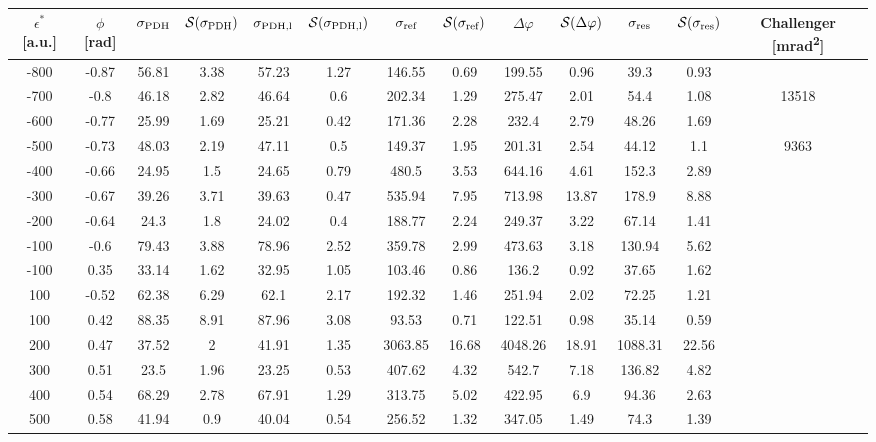 \begin{landscape}
	
	\begin{table}
	\centering
	\begin{tabular}{|c|c|c|c|c|c|c|c|c|c|c|c|c|}
		\hline
		$\epsilon^*$ [a.u.] & $\phi$ [\si{\radian}] & $\sigma_{\text{PDH}}$ & $\mathcal{S}(\sigma_{\text{PDH}})$ & $\sigma_{\text{PDH,l}}$ & $\mathcal{S}(\sigma_{\text{PDH,l}})$  & $\sigma_{\text{ref}}$ & $\mathcal{S}(\sigma_{\text{ref}})$ & $\Delta \varphi$ & $\mathcal{S}(\Delta \varphi)$ & $\sigma_{\text{res}}$  & $\mathcal{S}(\sigma_{\text{res}})$ & Challenger [\si{\milli\radian\squared}] \\
		\hline
		\hline
		-800 & -0.87 & 56.81 & 3.38 & 57.23 & 1.27 & 146.55 & 0.69 & 199.55 & 0.96 & 39.3 & 0.93 & \\
		-700 & -0.8 & 46.18 & 2.82 & 46.64 & 0.6 & 202.34 & 1.29 & 275.47 & 2.01 & 54.4 & 1.08 & 13518\\
		-600 & -0.77 & 25.99 & 1.69 & 25.21 & 0.42 & 171.36 & 2.28 & 232.4 & 2.79 & 48.26 & 1.69 & \\
		-500 & -0.73 & 48.03 & 2.19 & 47.11 & 0.5 & 149.37 & 1.95 & 201.31 & 2.54 & 44.12 & 1.1 & 9363\\
		-400 & -0.66 & 24.95 & 1.5 & 24.65 & 0.79 & 480.5 & 3.53 & 644.16 & 4.61 & 152.3 & 2.89 & \\
		-300 & -0.67 & 39.26 & 3.71 & 39.63 & 0.47 & 535.94 & 7.95 & 713.98 & 13.87 & 178.9 & 8.88 & \\
		-200 & -0.64 & 24.3 & 1.8 & 24.02 & 0.4 & 188.77 & 2.24 & 249.37 & 3.22 & 67.14 & 1.41 & \\
		-100 & -0.6 & 79.43 & 3.88 & 78.96 & 2.52 & 359.78 & 2.99 & 473.63 & 3.18 & 130.94 & 5.62 & \\
		-100 & 0.35 & 33.14 & 1.62 & 32.95 & 1.05 & 103.46 & 0.86 & 136.2 & 0.92 & 37.65 & 1.62 & \\
		100 & -0.52 & 62.38 & 6.29 & 62.1 & 2.17 & 192.32 & 1.46 & 251.94 & 2.02 & 72.25 & 1.21 & \\
		100 & 0.42 & 88.35 & 8.91 & 87.96 & 3.08 & 93.53 & 0.71 & 122.51 & 0.98 & 35.14 & 0.59 & \\
		200 & 0.47 & 37.52 & 2 & 41.91 & 1.35 & 3063.85 & 16.68 & 4048.26 & 18.91 & 1088.31 & 22.56 & \\
		300 & 0.51 & 23.5 & 1.96 & 23.25 & 0.53 & 407.62 & 4.32 & 542.7 & 7.18 & 136.82 & 4.82 & \\
		400 & 0.54 & 68.29 & 2.78 & 67.91 & 1.29 & 313.75 & 5.02 & 422.95 & 6.9 & 94.36 & 2.63 & \\
		500 & 0.58 & 41.94 & 0.9 & 40.04 & 0.54 & 256.52 & 1.32 & 347.05 & 1.49 & 74.3 & 1.39 & \\

\end{tabular}
\end{table}
\end{landscape}
